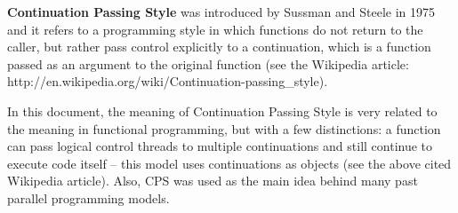 \documentclass{article}
\begin{document}
\begin{enumerate}
{\bf Continuation Passing Style} was introduced by Sussman and Steele in 1975 and
it refers to a programming style in which functions do not return to the
caller, but rather pass control explicitly to a continuation, which is
a function passed as an argument to the original function
(see the Wikipedia article: http://en.wikipedia.org/wiki/Continuation-passing\_style).

In this document, the meaning of Continuation Passing Style is very related to
the meaning in functional programming, but with a few distinctions: a function
can pass logical control threads to multiple continuations and still continue
to execute code itself -- this model uses continuations as objects (see the
above cited Wikipedia article). Also, CPS was used as the main idea behind
many past parallel programming models.


\end{enumerate}
\end{document}
